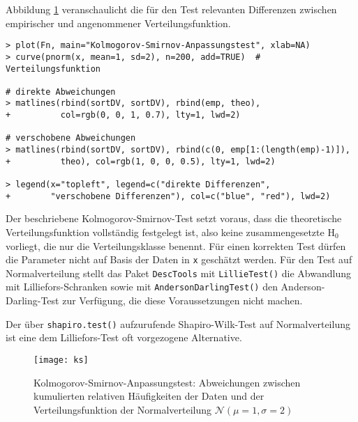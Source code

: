 Abbildung \ref{fig:ks} veranschaulicht die für den Test relevanten Differenzen zwischen empirischer und angenommener Verteilungsfunktion.
\begin{lstlisting}
> plot(Fn, main="Kolmogorov-Smirnov-Anpassungstest", xlab=NA)
> curve(pnorm(x, mean=1, sd=2), n=200, add=TRUE)  # Verteilungsfunktion

# direkte Abweichungen
> matlines(rbind(sortDV, sortDV), rbind(emp, theo),
+          col=rgb(0, 0, 1, 0.7), lty=1, lwd=2)

# verschobene Abweichungen
> matlines(rbind(sortDV, sortDV), rbind(c(0, emp[1:(length(emp)-1)]),
+          theo), col=rgb(1, 0, 0, 0.5), lty=1, lwd=2)

> legend(x="topleft", legend=c("direkte Differenzen",
+        "verschobene Differenzen"), col=c("blue", "red"), lwd=2)
\end{lstlisting}

Der beschriebene Kolmogorov-Smirnov-Test setzt voraus, dass die theoretische Verteilungsfunktion vollständig festgelegt ist, also keine zusammengesetzte $\text{H}_{0}$ vorliegt, die nur die Verteilungsklasse benennt. Für einen korrekten Test dürfen die Parameter nicht auf Basis der Daten in \lstinline!x! geschätzt werden. Für den Test auf Normalverteilung stellt das Paket \lstinline!DescTools! mit \lstinline!LillieTest()! die Abwandlung mit Lilliefors-Schranken sowie mit \lstinline!AndersonDarlingTest()! den Anderson-Darling-Test zur Verfügung, die diese Voraussetzungen nicht machen.

Der über \lstinline!shapiro.test()! aufzurufende Shapiro-Wilk-Test auf Normalverteilung ist eine dem Lilliefors-Test oft vorgezogene Alternative.

\begin{figure}[ht]
\centering
\texttt{[image: ks]}
\vspace*{-1.5em}
\caption{Kolmogorov-Smirnov-Anpassungstest: Abweichungen zwischen kumulierten relativen Häufigkeiten der Daten und der Verteilungsfunktion der Normalverteilung $\mathcal{N}(\mu=1, \sigma=2)$}
\label{fig:ks}
\end{figure}

